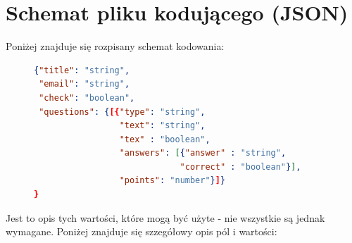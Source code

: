 \section{Schemat pliku kodującego (JSON)}
Poniżej znajduje się rozpisany schemat kodowania: 
\begin{figure}[H]
\begin{lstlisting}[language=json,firstnumber=1]
{"title": "string",
 "email": "string",
 "check": "boolean",
 "questions": {[{"type": "string", 
                 "text": "string",
                 "tex" : "boolean",
                 "answers": [{"answer" : "string",
                             "correct" : "boolean"}],
                 "points": "number"}]}
}

\end{lstlisting}
\end{figure}
Jest to opis tych wartości, które mogą być użyte - nie wszystkie są jednak  wymagane. Poniżej znajduje się szzegółowy opis pól i wartości:
